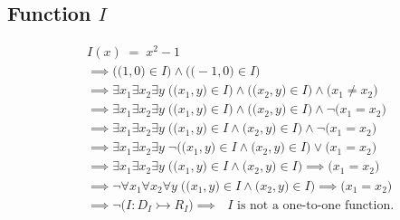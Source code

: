 \documentclass[12pt, letterpaper]{article}
\begin{document}
        \subsection{Function \(I\) }
        \vspace{-18pt}
        \begin{align*}
            & I(x) \; = \; x^2 - 1 \\
            & \implies \Big(\big(1, 0\big) \in I\Big) \wedge \Big(\big(-1, 0\big) \in I\Big) \\ 
            & \implies \exists x_1 \exists x_2 \exists y \; \Big( \big(x_1, y\big) \in I \Big) \wedge
                                                   \Big( \big(x_2, y\big) \in I \Big) \wedge
                                                   \Big( x_1 \neq x_2 \Big) \\
            & \implies \exists x_1 \exists x_2 \exists y \; \Big( \big(x_1, y\big) \in I \Big) \wedge
                                                   \Big( \big(x_2, y\big) \in I \Big) \wedge
                                                   \neg\Big( x_1 = x_2 \Big) \\
            & \implies \exists x_1 \exists x_2 \exists y \; \Big( \big(x_1, y\big) \in I \wedge
                                                   \big(x_2, y\big) \in I \Big) \wedge
                                                   \neg\Big( x_1 = x_2 \Big) \\
            & \implies \exists x_1 \exists x_2 \exists y \; \neg\Big( \big(x_1, y\big) \in I \wedge
                                                   \big(x_2, y\big) \in I \Big) \lor
                                                   \Big( x_1 = x_2 \Big) \\
            & \implies \exists x_1 \exists x_2 \exists y \; \Big( \big(x_1, y\big) \in I \wedge
                                                   \big(x_2, y\big) \in I \Big) \implies
                                                   \Big( x_1 = x_2 \Big) \\
            & \implies \neg\forall x_1 \forall x_2 \forall y \; \Big( \big(x_1, y\big) \in I \wedge
                                                   \big(x_2, y\big) \in I \Big) \implies
                                                   \Big( x_1 = x_2 \Big) \\
            & \implies \neg\Big( I : D_{I} \rightarrowtail R_{I} \Big)
              \implies \text{ \(I\) is not a one-to-one function.}
        \end{align*}
        
\end{document}
